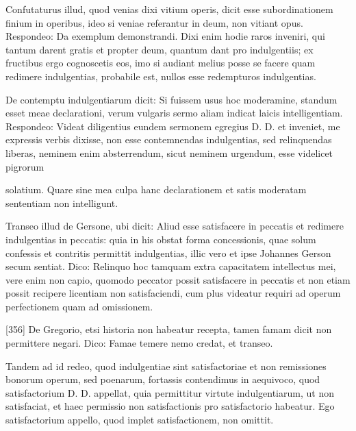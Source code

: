 Confutaturus illud, quod venias dixi vitium operis, dicit esse subordinationem finium in operibus, ideo si veniae referantur in deum, non vitiant opus. Respondeo: Da exemplum demonstrandi. Dixi enim hodie raros inveniri, qui tantum darent gratis et propter deum, quantum dant pro indulgentiis; ex fructibus ergo cognoscetis eos, imo si audiant melius posse se facere quam redimere indulgentias, probabile est, nullos esse redempturos indulgentias.

De contemptu indulgentiarum dicit: Si fuissem usus hoc moderamine, standum esset meae declarationi, verum vulgaris sermo aliam indicat laicis intelligentiam. Respondeo: Videat diligentius eundem sermonem egregius D. D. et inveniet, me expressis verbis dixisse, non esse contemnendas indulgentias, sed relinquendas liberas, neminem enim absterrendum, sicut neminem urgendum, esse videlicet pigrorum

solatium. Quare sine mea culpa hanc declarationem et satis moderatam sententiam non intelligunt.

Transeo illud de Gersone, ubi dicit: Aliud esse satisfacere in peccatis et redimere indulgentias in peccatis: quia in his obstat forma concessionis, quae solum confessis et contritis permittit indulgentias, illic vero et ipse Johannes Gerson secum sentiat. Dico: Relinquo hoc tamquam extra capacitatem intellectus mei, vere enim non capio, quomodo peccator possit satisfacere in peccatis et non etiam possit recipere licentiam non satisfaciendi, cum plus videatur requiri ad operum perfectionem quam ad omissionem.

[356] De Gregorio, etsi historia non habeatur recepta, tamen famam dicit non permittere negari. Dico: Famae temere nemo credat, et transeo.

Tandem ad id redeo, quod indulgentiae sint satisfactoriae et non remissiones bonorum operum, sed poenarum, fortassis contendimus in aequivoco, quod satisfactorium D. D. appellat, quia permittitur virtute indulgentiarum, ut non satisfaciat, et haec permissio non satisfactionis pro satisfactorio habeatur. Ego satisfactorium appello, quod implet satisfactionem, non omittit.

